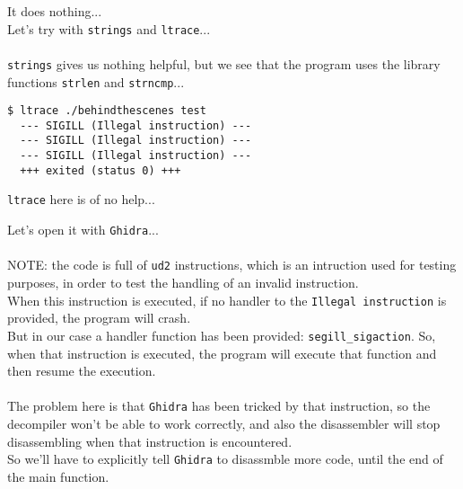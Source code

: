 \documentclass{article}
\begin{document}
\noindent
It does nothing...\\
Let's try with \texttt{strings} and \texttt{ltrace}...\\
\\
\texttt{strings} gives us nothing helpful, but we see that the program uses the library functions \texttt{strlen} and \texttt{strncmp}...

\begin{lstlisting}
$ ltrace ./behindthescenes test     
  --- SIGILL (Illegal instruction) ---
  --- SIGILL (Illegal instruction) ---
  --- SIGILL (Illegal instruction) ---
  +++ exited (status 0) +++    
\end{lstlisting}

\noindent
\texttt{ltrace} here is of no help...

\noindent
Let's open it with \texttt{Ghidra}...\\
\\
NOTE: the code is full of \texttt{ud2} instructions, which is an intruction used for testing
purposes, in order to test the handling of an invalid instruction.\\
When this instruction is executed, if no handler to the \texttt{Illegal instruction} is provided, the
program will crash.\\
But in our case a handler function has been provided: \texttt{segill\_sigaction}.
So, when that instruction is executed, the program will execute that function and then resume the execution.\\
\\
The problem here is that \texttt{Ghidra} has been tricked by that instruction, so the decompiler won't be able to
work correctly, and also the disassembler will stop disassembling when that instruction is encountered.\\
So we'll have to explicitly tell \texttt{Ghidra} to disassmble more code, until the end of the main function.
\end{document}
